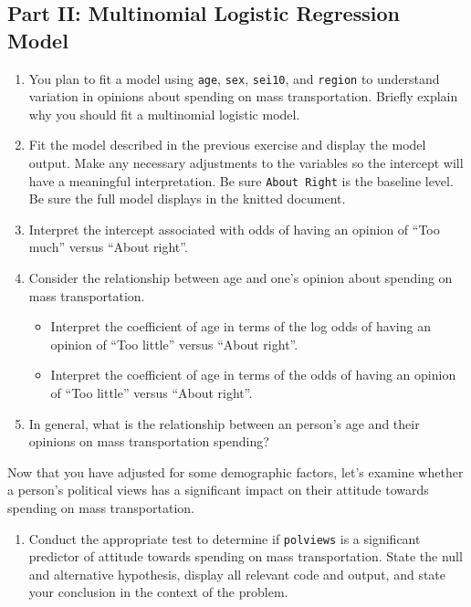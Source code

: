 \documentclass[]{book}
\providecommand{\tightlist}{%
  \setlength{\itemsep}{0pt}\setlength{\parskip}{0pt}}
\begin{document}
\subsection{Part II: Multinomial Logistic Regression
Model}\label{part-ii-multinomial-logistic-regression-model}

\begin{enumerate}
\def\labelenumi{\arabic{enumi}.}
\setcounter{enumi}{4}
\item
  You plan to fit a model using \texttt{age}, \texttt{sex},
  \texttt{sei10}, and \texttt{region} to understand variation in
  opinions about spending on mass transportation. Briefly explain why
  you should fit a multinomial logistic model.
\item
  Fit the model described in the previous exercise and display the model
  output. Make any necessary adjustments to the variables so the
  intercept will have a meaningful interpretation. Be sure
  \texttt{About\ Right} is the baseline level. Be sure the full model
  displays in the knitted document.
\item
  Interpret the intercept associated with odds of having an opinion of
  ``Too much'' versus ``About right''.
\item
  Consider the relationship between age and one's opinion about spending
  on mass transportation.

  \begin{itemize}
  \tightlist
  \item
    Interpret the coefficient of age in terms of the log odds of having
    an opinion of ``Too little'' versus ``About right''.
  \item
    Interpret the coefficient of age in terms of the odds of having an
    opinion of ``Too little'' versus ``About right''.
  \end{itemize}
\item
  In general, what is the relationship between an person's age and their
  opinions on mass transportation spending?
\end{enumerate}

Now that you have adjusted for some demographic factors, let's examine
whether a person's political views has a significant impact on their
attitude towards spending on mass transportation.

\begin{enumerate}
\def\labelenumi{\arabic{enumi}.}
\setcounter{enumi}{9}
\tightlist
\item
  Conduct the appropriate test to determine if \texttt{polviews} is a
  significant predictor of attitude towards spending on mass
  transportation. State the null and alternative hypothesis, display all
  relevant code and output, and state your conclusion in the context of
  the problem.
\end{enumerate}
\end{document}
